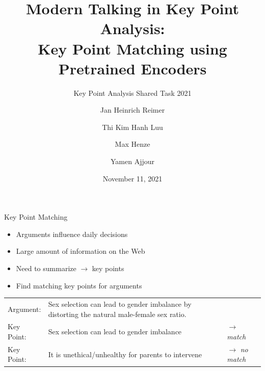 \documentclass[english,handout]{mlutalk}
\title{%
  Modern Talking in Key Point Analysis: \\
  Key Point Matching using Pretrained Encoders%
}
\subtitle{Key Point Analysis Shared Task 2021}
\author{\texorpdfstring{\smaller}{}Jan Heinrich Reimer \and Thi Kim Hanh Luu \and Max Henze \and Yamen Ajjour}
\institute{Martin Luther University Halle-Wittenberg, Germany}
\date{November 11, 2021}
\begin{document}
\titleframe

\begin{frame}{Key Point Matching}
  \begin{itemize}
    \item Arguments influence daily decisions~\cite{Bar-HaimEFKLS2020}
    \item Large amount of information on the Web
    \item Need to summarize \(\to\) key points
    \item Find matching key points for arguments
  \end{itemize}
  \begin{example}
    \smaller\renewcommand{\arraystretch}{1.15}
    \begin{tabularx}{0.855\linewidth}{@{}lXl@{}}
      Argument: & Sex selection can lead to gender imbalance by distorting the natural male-female sex ratio. \\
      Key Point: & Sex selection can lead to gender imbalance & \textcolor{Green4}{\(\to\) \emph{match}} \\
      Key Point: & It is unethical/unhealthy for parents to intervene & \textcolor{OrangeRed2}{\(\to\) \emph{no match}}
    \end{tabularx}
  \end{example}
\end{frame}
\end{document}
